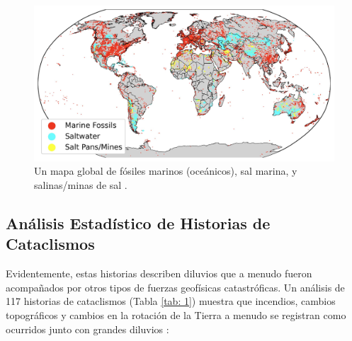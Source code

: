 \documentclass[10pt,twocolumn,letterpaper]{article}
\begin{document}
\begin{figure}[b]
\begin{center}
\includegraphics[width=1\textwidth]{marine.jpg}
\end{center}
   \caption{Un mapa global de fósiles marinos (oceánicos), sal marina, y salinas/minas de sal \cite{15,16,86,87}.}

   \label{fig:2}
\end{figure}

\subsection{Análisis Estadístico de Historias de Cataclismos}

Evidentemente, estas historias describen diluvios que a menudo fueron acompañados por otros tipos de fuerzas geofísicas catastróficas. Un análisis de 117 historias de cataclismos (Tabla \ref{tab: 1}) muestra que incendios, cambios topográficos y cambios en la rotación de la Tierra a menudo se registran como ocurridos junto con grandes diluvios \cite{14}:
\end{document}
